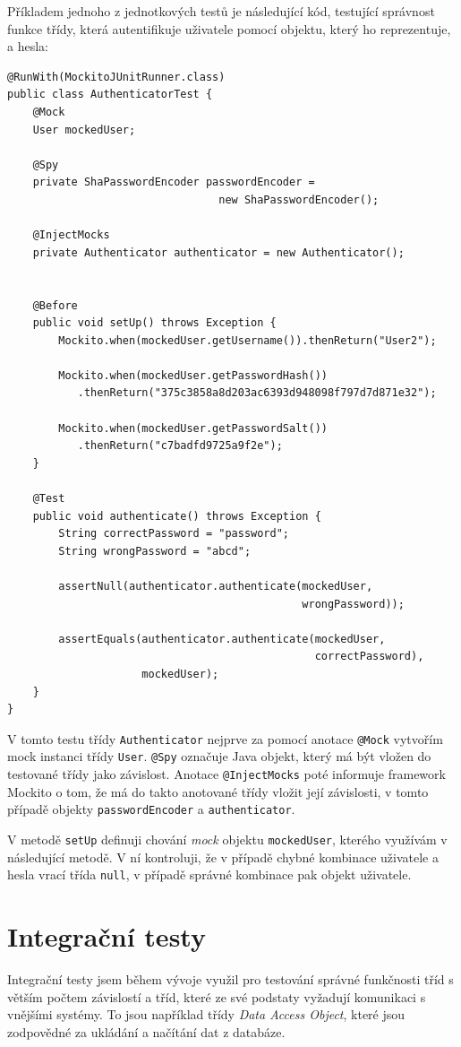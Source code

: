 \documentclass[thesis=B,czech]{FITthesis}[2012/06/26]
\begin{document}
		Příkladem jednoho z jednotkových testů je následující kód, testující správnost funkce třídy, která autentifikuje uživatele pomocí objektu, který ho reprezentuje, a hesla:
		
		\begin{Verbatim}[obeytabs,tabsize=2]
@RunWith(MockitoJUnitRunner.class)
public class AuthenticatorTest {
	@Mock
	User mockedUser;
	
	@Spy
	private ShaPasswordEncoder passwordEncoder = 
	                             new ShaPasswordEncoder();
	
	@InjectMocks
	private Authenticator authenticator = new Authenticator();
	
	
	@Before
	public void setUp() throws Exception {
		Mockito.when(mockedUser.getUsername()).thenReturn("User2");
		
		Mockito.when(mockedUser.getPasswordHash())
		   .thenReturn("375c3858a8d203ac6393d948098f797d7d871e32");
		       
		Mockito.when(mockedUser.getPasswordSalt())
		   .thenReturn("c7badfd9725a9f2e");
	}
	
	@Test
	public void authenticate() throws Exception {
		String correctPassword = "password";
		String wrongPassword = "abcd";
		
		assertNull(authenticator.authenticate(mockedUser, 
		                                      wrongPassword));
		                                      
		assertEquals(authenticator.authenticate(mockedUser, 
		                                        correctPassword), 
		             mockedUser);
	}
}
		\end{Verbatim}
		
				
		V tomto testu třídy \texttt{Authenticator} nejprve za pomocí anotace \texttt{@Mock} vytvořím mock instanci třídy \texttt{User}. \texttt{@Spy} označuje  Java objekt, který má být vložen do testované třídy jako závislost. Anotace \texttt{@InjectMocks} poté informuje framework Mockito o tom, že má do takto anotované třídy vložit její závislosti, v tomto případě objekty \texttt{passwordEncoder} a \texttt{authenticator}.
		
		V metodě \texttt{setUp} definuji chování \textit{mock} objektu \texttt{mockedUser}, kterého využívám v následující metodě. V ní kontroluji, že v případě chybné kombinace uživatele a hesla vrací třída \texttt{null}, v případě správné kombinace pak objekt uživatele.
		
		
		
	\section{Integrační testy}
		Integrační testy jsem během vývoje využil pro testování správné funkčnosti tříd s větším počtem závislostí a tříd, které ze své podstaty vyžadují komunikaci s vnějšími systémy. To jsou například třídy \textit{Data Access Object}, které jsou zodpovědné za ukládání a načítání dat z databáze.
		
\end{document}
